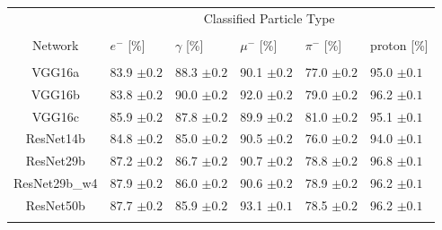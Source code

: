 \documentclass[11pt,a4paper]{article}
\begin{document}
\par \noindent
\vspace{2 mm}
\begin{minipage}{\linewidth}
\centering
{} \label{tab:classCompare} 
\begin{tabular}{clllll}
 & \multicolumn{5}{c}{Classified Particle Type} \\
\cline{2-6}
\vspace{-0.1in}\\
\vspace{0.05in}
Network & $e^-$ [\%] & $\gamma$ [\%] & $\mu^-$ [\%] & $\pi^-$ [\%] & proton [\%] \\
\hline 
\vspace{-0.1in}\\
\vspace{0.05in}
 VGG16a & 83.9 $\pm 0.2$ & 88.3 $\pm 0.2$  & 90.1 $\pm 0.2$ & 77.0 $\pm 0.2$ & 95.0 $\pm 0.1$ \\ 
 \vspace{0.05in}
 VGG16b & 83.8 $\pm 0.2$ & 90.0 $\pm 0.2$  & 92.0 $\pm 0.2$ & 79.0 $\pm 0.2$ & 96.2 $\pm 0.1$ \\ 
 \vspace{0.05in}
 VGG16c & 85.9 $\pm 0.2$ & 87.8 $\pm 0.2$  & 89.9 $\pm 0.2$ & 81.0 $\pm 0.2$ & 95.1 $\pm 0.1$ \\ 
 \vspace{0.05in}
 ResNet14b & 84.8 $\pm 0.2$ & 85.0 $\pm 0.2$  & 90.5 $\pm 0.2$ & 76.0 $\pm 0.2$ & 94.0 $\pm 0.1$ \\ 
 \vspace{0.05in}
 ResNet29b & 87.2 $\pm 0.2$ & 86.7 $\pm 0.2$  & 90.7 $\pm 0.2$ & 78.8 $\pm 0.2$ & 96.8 $\pm 0.1$ \\ 
 \vspace{0.05in}
 ResNet29b\_w4 & 87.9 $\pm 0.2 $ & 86.0 $\pm 0.2$  & 90.6 $\pm 0.2$ & 78.9 $\pm 0.2$ & 96.2 $\pm 0.1$ \\ 
 \vspace{0.05in}
 ResNet50b & 87.7 $\pm 0.2$ & 85.9 $\pm 0.2$  & 93.1 $\pm 0.1$ & 78.5 $\pm 0.2$ & 96.2 $\pm 0.1$ \\ 

 \vspace{0.05in}


\end{tabular}
\end{minipage}
\end{document}
